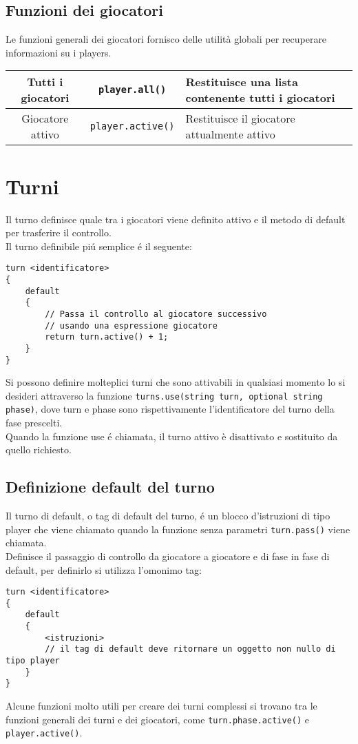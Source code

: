 \subsection{Funzioni dei giocatori}
Le funzioni generali dei giocatori fornisco delle utilità globali 
per recuperare informazioni su i players. \\
\begin{center}
\begin{tabular}{|c|c|p{5cm}|}
    \hline
    Tutti i giocatori & \lstinline|player.all()| & Restituisce una lista contenente tutti i giocatori \\
    \hline
    Giocatore attivo & \lstinline|player.active()| & Restituisce il giocatore attualmente attivo \\
    \hline
\end{tabular}
\end{center}

\section{Turni}
Il turno definisce quale tra i giocatori viene definito attivo e il metodo di default
per trasferire il controllo. \\
Il turno definibile piú semplice é il seguente:
\begin{lstlisting}
turn <identificatore>
{
    default
    {
        // Passa il controllo al giocatore successivo 
        // usando una espressione giocatore
        return turn.active() + 1;
    }
}
\end{lstlisting}
Si possono definire molteplici turni che sono attivabili in qualsiasi momento lo si desideri 
attraverso la funzione \lstinline|turns.use(string turn, optional string phase)|, dove
turn e phase sono rispettivamente l'identificatore del turno della fase prescelti. \\
Quando la funzione use é chiamata, il turno attivo è disattivato e sostituito da quello richiesto.

\subsection{Definizione default del turno}
Il turno di default, o tag di default del turno, é un blocco d'istruzioni di tipo player
che viene chiamato quando la funzione senza parametri \lstinline|turn.pass()| viene chiamata. \\
Definisce il passaggio di controllo da giocatore a giocatore e di fase in fase di default,
per definirlo si utilizza l'omonimo tag:
\begin{lstlisting}
turn <identificatore>
{
    default
    {
        <istruzioni>
        // il tag di default deve ritornare un oggetto non nullo di tipo player
    }
}
\end{lstlisting}
Alcune funzioni molto utili per creare dei turni complessi si trovano tra le 
funzioni generali dei turni e dei giocatori, come \lstinline|turn.phase.active()| e
\lstinline|player.active()|.

